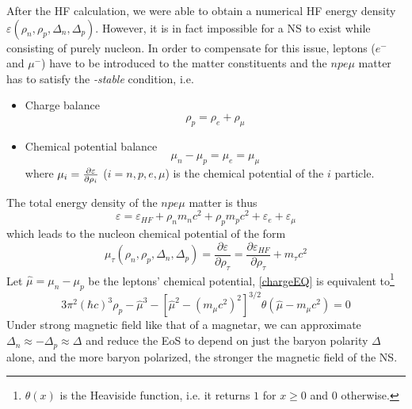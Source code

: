 After the \gls{HF} calculation, we were able to obtain a numerical \gls{HF} energy density $\varepsilon(\rho_n,\rho_p,\Delta_n,\Delta_p)$. However, it is in fact impossible for a \gls{NS} to exist while consisting of purely nucleon. In order to compensate for this issue, leptons ($e^-$ and $\mu^-$) have to be introduced to the matter constituents and the $npe\mu$ matter has to satisfy the \emph{\textbeta-stable} condition, i.e.
\begin{itemize}
        \item Charge balance
                \begin{equation}
                        \rho_p = \rho_e + \rho_\mu
                        \label{chargeEQ}
                \end{equation}
        \item Chemical potential balance
                \begin{equation}
                        \mu_n - \mu_p = \mu_e = \mu_\mu
                \end{equation}
                where $\mu_i = \pdv{\varepsilon}{\rho_i}$ ($i=n,p,e,\mu$) is the chemical potential of the $i$ particle.
\end{itemize}
The total energy density of the $npe\mu$ matter is thus
\begin{equation}
        \varepsilon = \varepsilon_{HF} + \rho_n m_n c^2 + \rho_p m_p c^2 + \varepsilon_e + \varepsilon_\mu 
\end{equation}
which leads to the nucleon chemical potential of the form
\begin{equation}
        \mu_\tau (\rho_n,\rho_p,\Delta_n,\Delta_p) = \frac{\partial \varepsilon}{\partial \rho_\tau}  = \frac{\partial \varepsilon_{HF}}{\partial \rho_\tau} + m_\tau c^2
\end{equation}
Let $\hat{\mu} = \mu_n - \mu_p$ be the leptons' chemical potential, \eqref{chargeEQ} is equivalent to\footnote{$\theta(x)$ is the Heaviside function, i.e. it returns $1$ for $x\geq 0$ and $0$ otherwise.}
\begin{equation}
        3\pi^2 (\hbar c)^3 \rho_p - \hat{\mu}^3 - \left[ \hat{\mu}^2 - (m_\mu c^2)^2 \right]^{3/2} \theta(\hat{\mu} - m_\mu c^2) = 0
\end{equation}
Under strong magnetic field like that of a magnetar, we can approximate $\Delta_n \approx -\Delta_p \approx \Delta$ and reduce the \gls{EoS} to depend on just the baryon polarity $\Delta$ alone, and the more baryon polarized, the stronger the magnetic field of the \gls{NS}.\par
